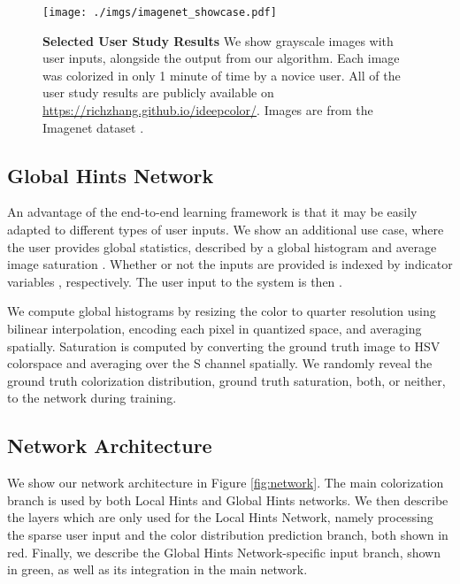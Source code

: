 \documentclass[acmtog,authorversion]{acmart}
\begin{document}
\begin{figure*}[t!]
\texttt{[image: ./imgs/imagenet\_showcase.pdf]}
\vspace{-6mm}
\caption{\textbf{Selected User Study Results} We show grayscale images with user inputs, alongside the output from our algorithm. Each image was colorized in only 1 minute of time by a novice user. All of the user study results are publicly available on \url{https://richzhang.github.io/ideepcolor/}. Images are from the Imagenet dataset \cite{russakovsky2015imagenet}.}
\label{fig:userstudy_showcase}
\vspace{-2mm}
\end{figure*}

\subsection{Global Hints Network}
\label{sec:globalhintsnet}

An advantage of the end-to-end learning framework is that it may be easily adapted to different types of user inputs. We show an additional use case, where the user provides global statistics, described by a global histogram  and average image saturation . Whether or not the inputs are provided is indexed by indicator variables , respectively. The user input to the system is then .

We compute global histograms by resizing the color  to quarter resolution using bilinear interpolation, encoding each pixel in quantized  space, and averaging spatially. Saturation is computed by converting the ground truth image to HSV colorspace and averaging over the S channel spatially. We randomly reveal the ground truth colorization distribution, ground truth saturation, both, or neither, to the network during training.

\subsection{Network Architecture}
\label{sec:net-arch}

We show our network architecture in Figure \ref{fig:network}. The main colorization branch is used by both Local Hints and Global Hints networks. We then describe the layers which are only used for the Local Hints Network, namely processing the sparse user input  and the color distribution prediction branch, both shown in red. Finally, we describe the Global Hints Network-specific input branch, shown in green, as well as its integration in the main network.
\end{document}
